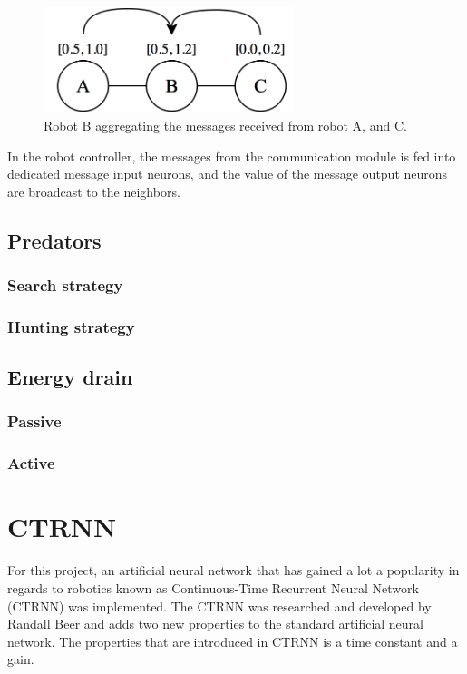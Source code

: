 	\begin{figure}[H]
		\centering
		\includegraphics[width=0.65\textwidth]{chapters/res/Local_communication.png}
		\caption{Robot B aggregating the messages received from robot A, and C.}
		\label{fig:local_communication}
	\end{figure}
	
	In the robot controller, the messages from the communication module is fed into dedicated message input neurons, and the value of the message output neurons are broadcast to the neighbors.

		
	\subsection{Predators}
		\subsubsection{Search strategy}
		\subsubsection{Hunting strategy}
	\subsection{Energy drain}
		\subsubsection{Passive}
		\subsubsection{Active}
\clearpage
\section{CTRNN}
For this project, an artificial neural network that has gained a lot a popularity in regards to robotics known as Continuous-Time Recurrent Neural Network (CTRNN) was implemented. 
The CTRNN was researched and developed by Randall Beer and adds two new properties to the standard artificial neural network. 
The properties that are introduced in CTRNN is a time constant and a gain.

